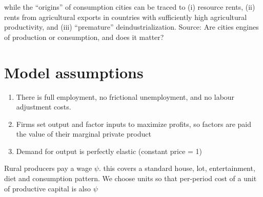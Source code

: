 while the ``origins'' of consumption cities can be traced to (i)
resource rents, (ii) rents from agricultural exports in countries with sufficiently high agricultural productivity, and (iii) ``premature'' deindustrialization.  Source:
{Are cities engines of production or consumption, and does it matter?}


\section{Model assumptions}
\begin{enumerate}
\item There is full employment, no frictional unemployment, and no labour adjustment costs.
\item Firms set output and factor inputs to maximize profits, so factors are paid the value of their marginal private product
\item Demand for output is perfectly elastic (constant price = 1)
\end{enumerate}


Rural producers pay a wage $\psi$. this covers a standard house, lot, entertainment, diet and consumption pattern. We  choose units so that per-period cost of a unit of productive capital is also $\psi$
